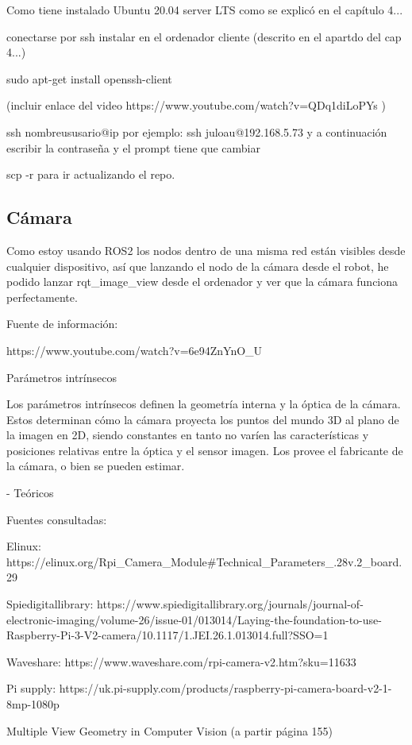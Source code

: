 Como tiene instalado Ubuntu 20.04 server LTS como se explicó en el capítulo 4... 

conectarse por ssh instalar en el ordenador cliente (descrito en el apartdo del cap 4...) 

sudo apt-get install openssh-client

(incluir enlace del video  https://www.youtube.com/watch?v=QDq1diLoPYs ) 


ssh nombreususario@ip por ejemplo: ssh juloau@192.168.5.73 y a continuación escribir la contraseña y el prompt tiene que cambiar 
 

scp -r para ir actualizando el repo.

\subsection{Cámara}
\label{subsec:configcamara}

Como estoy usando ROS2 los nodos dentro de una misma red están visibles desde cualquier dispositivo, así que lanzando el nodo de la cámara desde el robot, he podido lanzar rqt\_image\_view desde el ordenador y ver que la cámara funciona perfectamente.


Fuente de información: 

https://www.youtube.com/watch?v=6e94ZnYnO\_U


Parámetros intrínsecos

Los parámetros intrínsecos definen la geometría interna y la óptica de la cámara. Estos determinan cómo la cámara proyecta los puntos del mundo 3D al plano de la imagen en 2D, siendo constantes en tanto no varíen las características y posiciones relativas entre la óptica y el sensor imagen. Los provee el fabricante de la cámara, o bien se pueden estimar.

- Teóricos 

Fuentes consultadas:

Elinux: https://elinux.org/Rpi\_Camera\_Module\#Technical\_Parameters\_.28v.2\_board.29

Spiedigitallibrary: https://www.spiedigitallibrary.org/journals/journal-of-electronic-imaging/volume-26/issue-01/013014/Laying-the-foundation-to-use-Raspberry-Pi-3-V2-camera/10.1117/1.JEI.26.1.013014.full?SSO=1

Waveshare: https://www.waveshare.com/rpi-camera-v2.htm?sku=11633


Pi supply: https://uk.pi-supply.com/products/raspberry-pi-camera-board-v2-1-8mp-1080p


Multiple View Geometry in Computer Vision (a partir página 155)



